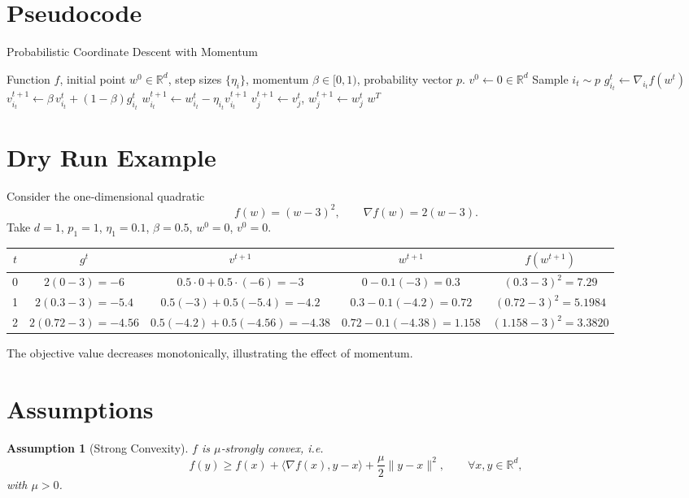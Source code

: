 \documentclass{article}
\newtheorem{assumption}{Assumption}
\newcommand{\R}{\mathbb{R}}
\begin{document}
\section*{Pseudocode}
\begin{algorithm}[H]
\caption{Probabilistic Coordinate Descent with Momentum}
\begin{algorithmic}[1]
\Require Function $f$, initial point $w^{0}\in\R^{d}$, step sizes $\{\eta_i\}$,
        momentum $\beta\in[0,1)$, probability vector $p$.
\State $v^{0}\gets 0\in\R^{d}$
    \State Sample $i_t\sim p$                               
    \State $g_{i_t}^{t}\gets \nabla_{i_t}f(w^{t})$           
    \State $v_{i_t}^{t+1}\gets \beta\,v_{i_t}^{t}+(1-\beta)g_{i_t}^{t}$ 
    \State $w_{i_t}^{t+1}\gets w_{i_t}^{t}-\eta_{i_t}v_{i_t}^{t+1}$       
        \State $v_{j}^{t+1}\gets v_{j}^{t}$, \; $w_{j}^{t+1}\gets w_{j}^{t}$
    \EndFor
\EndFor
\State \Return $w^{T}$
\end{algorithmic}
\end{algorithm}

\section*{Dry Run Example}
Consider the one‑dimensional quadratic
\[
f(w)=(w-3)^{2},\qquad \nabla f(w)=2(w-3).
\]
Take $d=1$, $p_1=1$, $\eta_1=0.1$, $\beta=0.5$, $w^{0}=0$, $v^{0}=0$.

\begin{center}
\begin{tabular}{c|c|c|c|c}
$t$ & $g^{t}$ & $v^{t+1}$ & $w^{t+1}$ & $f(w^{t+1})$\\ \hline
0 & $2(0-3)=-6$ & $0.5\cdot0+0.5\cdot(-6)=-3$ & $0-0.1(-3)=0.3$ & $(0.3-3)^2=7.29$\\
1 & $2(0.3-3)=-5.4$ & $0.5(-3)+0.5(-5.4)=-4.2$ & $0.3-0.1(-4.2)=0.72$ & $(0.72-3)^2=5.1984$\\
2 & $2(0.72-3)=-4.56$ & $0.5(-4.2)+0.5(-4.56)=-4.38$ & $0.72-0.1(-4.38)=1.158$ & $(1.158-3)^2=3.3820$\\
\end{tabular}
\end{center}
The objective value decreases monotonically, illustrating the effect of momentum.

\newpage
\section*{Assumptions}
\begin{assumption}[Strong Convexity]\label{ass:strong}
$f$ is $\mu$‑strongly convex, i.e.
\[
f(y)\ge f(x)+\langle\nabla f(x),y-x\rangle+\frac{\mu}{2}\|y-x\|^{2},
\qquad\forall x,y\in\R^{d},
\]
with $\mu>0$.
\end{assumption}
\end{document}
